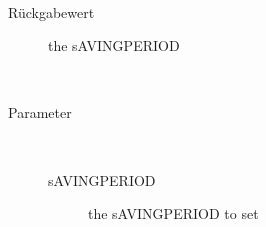 \begin{description}
~ 
\begin{description}
\item[Rückgabewert] 
the sAVINGPERIOD
\end{description}
\item[{\ltdHypertarget{ontologyFramework.OFErrorManagement.OFGUI.ClassExcange.setSAVINGPERIOD(long)}{setSAVINGPERIOD}\label{ontologyFramework.OFErrorManagement.OFGUI.ClassExcange.setSAVINGPERIOD(long)}}]
~ 
\begin{description}
\item[Parameter] ~
\begin{description}
\item[sAVINGPERIOD]
the sAVINGPERIOD to set
\end{description}
\end{description}
\end{description}
